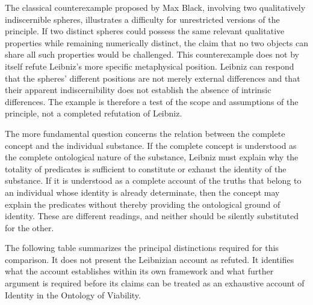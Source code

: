 \label{para:VS.B01.P01.C08.S07.SS08.P004}

The classical counterexample proposed by
Max Black, involving two qualitatively
indiscernible spheres, illustrates a difficulty
for unrestricted versions of the principle.
If two distinct spheres could possess the
same relevant qualitative properties while
remaining numerically distinct, the claim
that no two objects can share all such
properties would be challenged. This
counterexample does not by itself refute
Leibniz's more specific metaphysical
position. Leibniz can respond that the
spheres' different positions are not
merely external differences and that
their apparent indiscernibility does
not establish the absence of intrinsic
differences. The example is therefore
a test of the scope and assumptions of
the principle, not a completed refutation
of Leibniz. \cite{BlackIdentityIndiscernibles1952}
\cite{RodriguezPereyraIdentitySEP2025}

\label{para:VS.B01.P01.C08.S07.SS08.P005}

The more fundamental question concerns the
relation between the complete concept and
the individual substance. If the complete
concept is understood as the complete
ontological nature of the substance, Leibniz
must explain why the totality of predicates
is sufficient to constitute or exhaust
the identity of the substance. If it is
understood as a complete account of the
truths that belong to an individual whose
identity is already determinate, then the
concept may explain the predicates without
thereby providing the ontological ground
of identity. These are different readings,
and neither should be silently substituted
for the other.

\label{para:VS.B01.P01.C08.S07.SS08.P006}

The following table summarizes the principal
distinctions required for this comparison.
It does not present the Leibnizian account
as refuted. It identifies what the account
establishes within its own framework and
what further argument is required before
its claims can be treated as an exhaustive
account of Identity in the Ontology of Viability.





